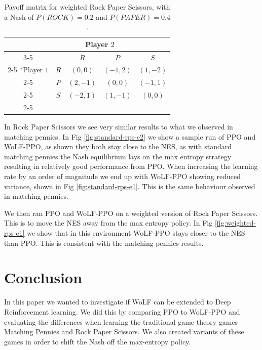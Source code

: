 \documentclass[conference]{IEEEtran}
\begin{document}
\begin{table}[!ht]
    \centering
    \setlength{\extrarowheight}{2pt}
    \begin{tabular}{*{5}{c|}}
      \multicolumn{2}{c}{} & \multicolumn{2}{c}{Player $2$}\\\cline{3-5}
      \multicolumn{1}{c}{} &  & $R$  & $P$ & $S$ \\\cline{2-5}
      \multirow{2}*{Player $1$}  & $R$ & $(0,0)$ & $(-1,2)$ & $(1,-2)$ \\\cline{2-5}
      & $P$ & $(2,-1)$ & $(0,0)$ & $(-1,1)$ \\\cline{2-5}
      & $S$ & $(-2,1)$ & $(1,-1)$ & $(0,0)$ \\\cline{2-5}
    \end{tabular}
    \caption{Payoff matrix for weighted Rock Paper Scissors, with a Nash of $P(ROCK)=0.2$ and $P(PAPER)=0.4$.}
    \label{tab:weighted-rps}
\end{table}

In Rock Paper Scissors we see very similar results to what we observed in matching pennies. In Fig \ref{fig:standard-rps-e2} we show a sample run of PPO and WoLF-PPO, as shown they both stay close to the NES, as with standard matching pennies the Nash equilibrium lays on the max entropy strategy resulting in relatively good performance from PPO. When increasing the learning rate by an order of magnitude we end up with WoLF-PPO showing reduced variance, shown in Fig \ref{fig:standard-rps-e1}. This is the same behaviour observed in matching pennies.

We then ran PPO and WoLF-PPO on a weighted version of Rock Paper Scissors. This is to move the NES away from the max entropy policy. In Fig \ref{fig:weighted-rps-e1} we show that in this environment WoLF-PPO stays closer to the NES than PPO. This is consistent with the matching pennies results.

\section{Conclusion}


In this paper we wanted to investigate if WoLF can be extended to Deep Reinforcement learning. We did this by comparing PPO to WoLF-PPO and evaluating the differences when learning the traditional game theory games Matching Pennies and Rock Paper Scissors. We also created variants of these games in order to shift the Nash off the max-entropy policy.
\end{document}
